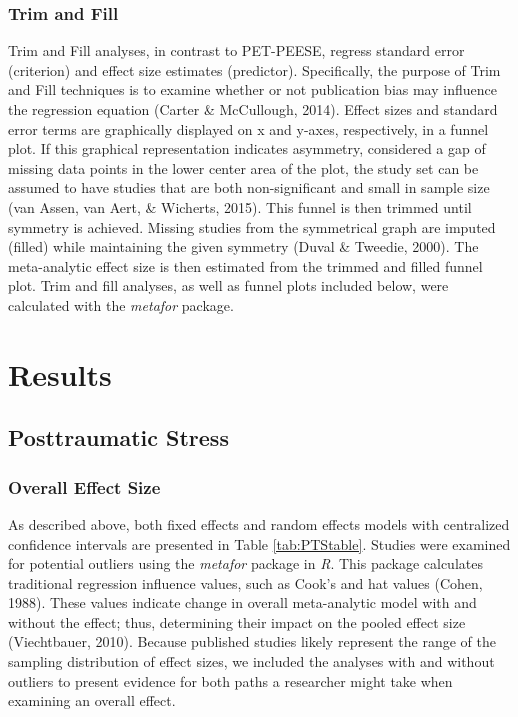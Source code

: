 \documentclass[,man]{apa6}
\begin{document}
\hypertarget{trim-and-fill}{%
\subsubsection{Trim and Fill}\label{trim-and-fill}}

Trim and Fill analyses, in contrast to PET-PEESE, regress standard error (criterion) and effect size estimates (predictor). Specifically, the purpose of Trim and Fill techniques is to examine whether or not publication bias may influence the regression equation (Carter \& McCullough, 2014). Effect sizes and standard error terms are graphically displayed on x and y-axes, respectively, in a funnel plot. If this graphical representation indicates asymmetry, considered a gap of missing data points in the lower center area of the plot, the study set can be assumed to have studies that are both non-significant and small in sample size (van Assen, van Aert, \& Wicherts, 2015). This funnel is then trimmed until symmetry is achieved. Missing studies from the symmetrical graph are imputed (filled) while maintaining the given symmetry (Duval \& Tweedie, 2000). The meta-analytic effect size is then estimated from the trimmed and filled funnel plot. Trim and fill analyses, as well as funnel plots included below, were calculated with the \emph{metafor} package.

\hypertarget{results}{%
\section{Results}\label{results}}

\hypertarget{posttraumatic-stress-1}{%
\subsection{Posttraumatic Stress}\label{posttraumatic-stress-1}}

\hypertarget{overall-effect-size}{%
\subsubsection{Overall Effect Size}\label{overall-effect-size}}

As described above, both fixed effects and random effects models with centralized confidence intervals are presented in Table \ref{tab:PTStable}. Studies were examined for potential outliers using the \emph{metafor} package in \emph{R}. This package calculates traditional regression influence values, such as Cook's and hat values (Cohen, 1988). These values indicate change in overall meta-analytic model with and without the effect; thus, determining their impact on the pooled effect size (Viechtbauer, 2010). Because published studies likely represent the range of the sampling distribution of effect sizes, we included the analyses with and without outliers to present evidence for both paths a researcher might take when examining an overall effect.
\end{document}
